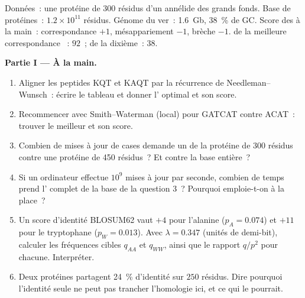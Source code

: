 \begin{problem}
\label{pb:b3:bioinformatics:1}
Données~: une protéine de \num{300} résidus d'un annélide des grands
fonds. Base de protéines~: $1.2\times 10^{11}$ résidus. Génome du ver~:
\qty{1.6}{Gb}, \qty{38}{\%} de GC. Score des  à la main~:
correspondance $+1$, mésappariement $-1$, brèche $-1$.  de
la meilleure correspondance ~: $92$~; de la dixième~: $38$.

\medskip
\noindent\textbf{Partie I --- À la main.}
\begin{enumerate}
  \item Aligner les peptides KQT et KAQT par la récurrence de
        Needleman--Wunsch~: écrire le tableau et donner l'
        optimal et son score.
  \item Recommencer avec Smith--Waterman (local) pour GATCAT contre
        ACAT~: trouver le meilleur  et son score.
  \item Combien de mises à jour de cases demande un 
        de la protéine de \num{300} résidus contre une protéine de
        \num{450} résidus~? Et contre la base entière~?
  \item Si un ordinateur effectue $10^{9}$ mises à jour par seconde,
        combien de temps prend l' complet de la base de la
        question 3~? Pourquoi emploie-t-on  à la place~?
  \item Un score d'identité BLOSUM62 vaut $+4$ pour l'alanine ($p_{A} =
        0.074$) et $+11$ pour le tryptophane ($p_{W} = 0.013$). Avec
        $\lambda = 0.347$ (unités de demi-bit), calculer les fréquences
        cibles $q_{AA}$ et $q_{WW}$, ainsi que le rapport $q/p^{2}$
        pour chacune. Interpréter.
  \item Deux protéines partagent \qty{24}{\%} d'identité sur $250$
        résidus. Dire pourquoi l'identité seule ne peut pas trancher
        l'homologie ici, et ce qui le pourrait.
\end{enumerate}


\end{problem}
